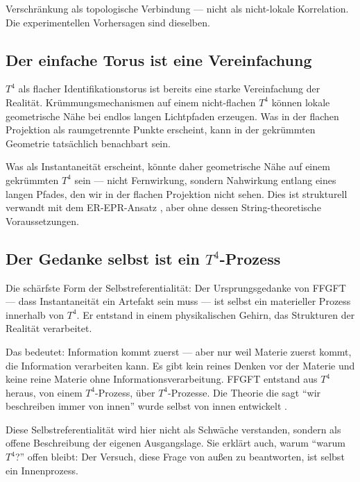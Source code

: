 \begin{keyresult}
Verschränkung als topologische Verbindung --- nicht als nicht-lokale Korrelation. Die experimentellen Vorhersagen sind dieselben.
\end{keyresult}

\subsection{Der einfache Torus ist eine Vereinfachung}

$T^4$ als flacher Identifikationstorus ist bereits eine starke Vereinfachung der Realität. Krümmungsmechanismen auf einem nicht-flachen $T^4$ können lokale geometrische Nähe bei endlos langen Lichtpfaden erzeugen. Was in der flachen Projektion als raumgetrennte Punkte erscheint, kann in der gekrümmten Geometrie tatsächlich benachbart sein.

Was als Instantaneität erscheint, könnte daher geometrische Nähe auf einem gekrümmten $T^4$ sein --- nicht Fernwirkung, sondern Nahwirkung entlang eines langen Pfades, den wir in der flachen Projektion nicht sehen. Dies ist strukturell verwandt mit dem ER-EPR-Ansatz \cite{Maldacena2013}, aber ohne dessen String-theoretische Voraussetzungen.

\subsection{Der Gedanke selbst ist ein $T^4$-Prozess}

Die schärfste Form der Selbstreferentialität: Der Ursprungsgedanke von FFGFT --- dass Instantaneität ein Artefakt sein muss --- ist selbst ein materieller Prozess innerhalb von $T^4$. Er entstand in einem physikalischen Gehirn, das Strukturen der Realität verarbeitet.

Das bedeutet: Information kommt zuerst --- aber nur weil Materie zuerst kommt, die Information verarbeiten kann. Es gibt kein reines Denken vor der Materie und keine reine Materie ohne Informationsverarbeitung. FFGFT entstand aus $T^4$ heraus, von einem $T^4$-Prozess, über $T^4$-Prozesse. Die Theorie die sagt ``wir beschreiben immer von innen'' wurde selbst von innen entwickelt \cite{Epistemologie2026}.

Diese Selbstreferentialität wird hier nicht als Schwäche verstanden, sondern als offene Beschreibung der eigenen Ausgangslage. Sie erklärt auch, warum ``warum $T^4$?'' offen bleibt: Der Versuch, diese Frage von außen zu beantworten, ist selbst ein Innenprozess.

